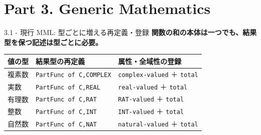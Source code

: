 \documentclass[dvipdfmx,aspectratio=169,11pt]{beamer}
\begin{document}
\section{Part 3. Generic Mathematics}
\begin{frame}[fragile,t]{3.1 - 現行 MML: 型ごとに増える再定義・登録}
\textcolor{blue!55!black}{\textbf{関数の和の本体は一つでも、結果型を保つ記述は型ごとに必要。}}

\par{}
\begin{scriptsize}
\setlength{\tabcolsep}{3pt}
\renewcommand{\arraystretch}{1.15}
\begin{tabular}{lll}
\toprule
\textbf{値の型} & \textbf{結果型の再定義} & \textbf{属性・全域性の登録} \\
\midrule
複素数 & \texttt{PartFunc of C,COMPLEX} & \texttt{complex-valued} ＋ \texttt{total} \\
実数 & \texttt{PartFunc of C,REAL} & \texttt{real-valued} ＋ \texttt{total} \\
有理数 & \texttt{PartFunc of C,RAT} & \texttt{RAT-valued} ＋ \texttt{total} \\
整数 & \texttt{PartFunc of C,INT} & \texttt{INT-valued} ＋ \texttt{total} \\
自然数 & \texttt{PartFunc of C,NAT} & \texttt{natural-valued} ＋ \texttt{total} \\
\bottomrule
\end{tabular}
\end{scriptsize}


\end{frame}
\end{document}
